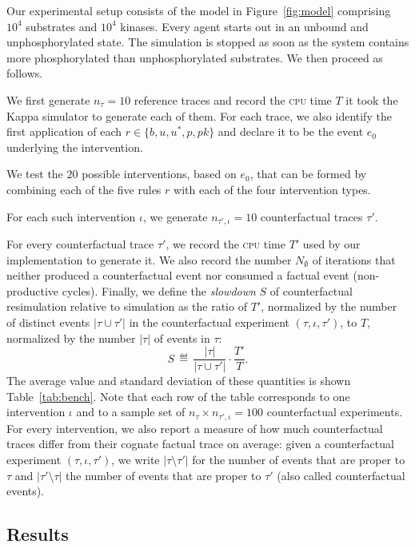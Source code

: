 Our experimental setup consists of the model in Figure~\ref{fig:model} comprising $10^4$ substrates and $10^4$ kinases. Every agent starts out in an unbound and unphosphorylated state. The simulation is stopped as soon as the system contains more phosphorylated than unphosphorylated substrates. We then proceed as follows.
\begin{inparaenum}[(i)]
\item We first generate $n_{\tau}=10$ reference traces and record the \textsc{cpu} time $T$ it took the Kappa simulator to generate each of them. For each trace, we also identify the first application of each $r\in\{b,u,u^{\ast},p,pk\}$ and declare it to be the event $e_0$ underlying the intervention.
\item We test the $20$ possible
interventions, based on $e_0$, that can be formed by combining each of the five rules $r$ with each of the four intervention types.
\item For each such intervention $\iota$, we generate $n_{\tau',\iota} = 10$
  counterfactual traces $\tau'$.
\item For every counterfactual trace $\tau'$, we record 
 the \textsc{cpu} time $T'$ used by our implementation to generate it. We
also record the number $N_{\emptyset}$ of iterations that neither produced a
counterfactual event nor consumed a factual event (non-productive cycles).
Finally, we define the \textit{slowdown} $S$ of counterfactual resimulation
relative to simulation as the ratio of $T'$, normalized by the number of distinct events $|\tau \cup \tau'|$ in the counterfactual experiment $(\tau, \iota, \tau')$, to $T$, normalized by the number $|\tau|$ of events in
$\tau$:
\[ 
  S \,\eqdef\, \frac{|\tau|}{|\tau \cup \tau'|} \cdot\frac{T'}{T}. 
\] 
The average value and standard deviation of these quantities is shown
Table~\ref{tab:bench}. Note that each row of the table corresponds to one
intervention $\iota$ and to a sample set of $n_{\tau} \times n_{\tau',\iota} =
100$ counterfactual experiments. For every intervention, we also report a
measure of how much counterfactual traces differ from their cognate factual
trace on average: given a counterfactual experiment $(\tau, \iota, \tau')$, we
write $|\tau \!\setminus\! \tau'|$ for the number of events that are proper to
$\tau$ and $|\tau' \!\setminus\! \tau|$ the number of events that are proper to
$\tau'$ (also called counterfactual events). 
\end{inparaenum}

\subsection{Results}

